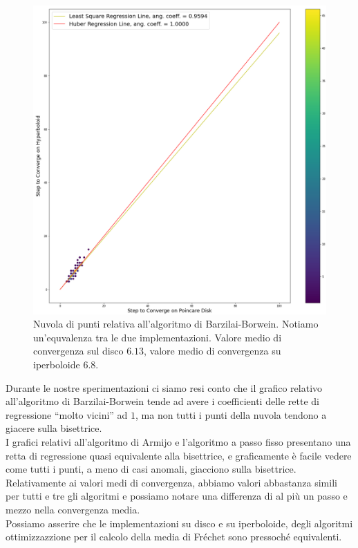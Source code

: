 \documentclass[a4paper, 12pt]{article}
\begin{document}
\begin{figure}[H] %
    \centering\includegraphics[width=1\textwidth]{barzilai_borwein.png}
    \caption{Nuvola di punti relativa all'algoritmo di Barzilai-Borwein. Notiamo un'equvalenza tra le due implementazioni. Valore medio di convergenza sul disco $6.13$, valore medio di convergenza su iperboloide $6.8$.}
\end{figure}
Durante le nostre sperimentazioni ci siamo resi conto che il grafico relativo all'algoritmo di Barzilai-Borwein tende ad avere i coefficienti delle rette di regressione ``molto vicini'' ad $1$, ma non tutti i punti della nuvola tendono a giacere sulla bisettrice.\\
I grafici relativi all'algoritmo di Armijo e l'algoritmo a passo fisso presentano una retta di regressione quasi equivalente alla bisettrice, e graficamente è facile vedere come tutti i punti, a meno di casi anomali, giacciono sulla bisettrice. Relativamente ai valori medi di convergenza, abbiamo valori abbastanza simili per tutti e tre gli algoritmi e possiamo notare una differenza di al più un passo e mezzo nella convergenza media.\\
Possiamo asserire che le implementazioni su disco e su iperboloide, degli algoritmi ottimizzazzione per il calcolo della media di Fréchet sono pressoché equivalenti.\\
\end{document}
